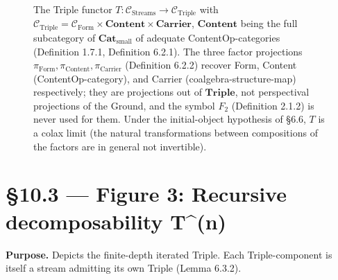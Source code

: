 \documentclass[11pt, openany]{book}
\newcommand{\sectionbreak}{\clearpage}
\begin{document}
\begin{figure}[htbp]
\centering
{}
\caption{The Triple functor $T : \mathcal{C}_\mathrm{Streams} \to \mathcal{C}_\mathrm{Triple}$ with $\mathcal{C}_\mathrm{Triple} = \mathcal{C}_\mathrm{Form} \times \mathbf{Content} \times \mathbf{Carrier}$, $\mathbf{Content}$ being the full subcategory of $\mathbf{Cat}_\mathrm{small}$ of adequate ContentOp-categories (Definition 1.7.1, Definition 6.2.1). The three factor projections $\pi_\mathrm{Form}, \pi_\mathrm{Content}, \pi_\mathrm{Carrier}$ (Definition 6.2.2) recover Form, Content (ContentOp-category), and Carrier (coalgebra-structure-map) respectively; they are projections out of $\mathbf{Triple}$, not perspectival projections of the Ground, and the symbol $F_2$ (Definition 2.1.2) is never used for them. Under the initial-object hypothesis of §6.6, $T$ is a colax limit (the natural transformations between compositions of the factors are in general not invertible).}
\label{fig:triple-functor}
\end{figure}

\sectionbreak

\section{§10.3 --- Figure 3: Recursive decomposability T\textasciicircum{}(n)}

\textbf{Purpose.} Depicts the finite-depth iterated Triple. Each Triple-component is itself a stream admitting its own Triple (Lemma 6.3.2).
\end{document}
